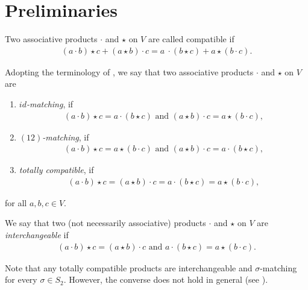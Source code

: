 \documentclass{jonasart}
\begin{document}
	\section{Preliminaries}\label{prelim}

	\begin{definition}
		Two associative products $\cdot$ and $\star$ on $V$ are called compatible if
		\begin{align*}
			(a\cdot b)\star c + (a\star b)\cdot c= a~\cdot(b\star c)+a\star (b\cdot c).
		\end{align*}
	\end{definition}

	\begin{definition}
		Adopting the terminology of \textrm{\cite{zgg23}}, we say that two associative products $\cdot$ and $\star$ on $V$ are
		\begin{enumerate}
			\item \textit{$id$-matching}, if
			\begin{align}\label{id-ass-identity}
				(a\cdot b)\star c = a\cdot(b\star c) \text{ and } (a\star b)\cdot c = a\star(b\cdot c),
			\end{align}
			\item \textit{$(12)$-matching}, if
			\begin{align}\label{matching-ass-identity}
				(a\cdot b)\star c = a\star(b\cdot c) \text{ and } (a\star b)\cdot c = a\cdot(b\star c),
			\end{align}
			\item \textit{totally compatible}, if
			\begin{align}
				(a\cdot b)\star c = (a\star b)\cdot c = a\cdot (b\star c) = a\star (b\cdot c),
			\end{align}
		\end{enumerate}
		for all $a,b,c\in V$.
	\end{definition}

	\begin{definition}
		We say that two (not necessarily associative) products $\cdot$ and $\star$ on $V$ are \textit{interchangeable} if
		\begin{align}\label{interchangeable-ass-identity}
			(a\cdot b)\star c = (a\star b)\cdot c \text{ and } a\cdot(b\star c) = a\star (b\cdot c).
		\end{align}
	\end{definition}

	Note that any totally compatible products are interchangeable and $\sigma$-matching for every $\sigma \in S_2$. However, the converse does not hold in general
	(see \cite[Examples 1.4 and 1.5]{Khr}).
\end{document}
